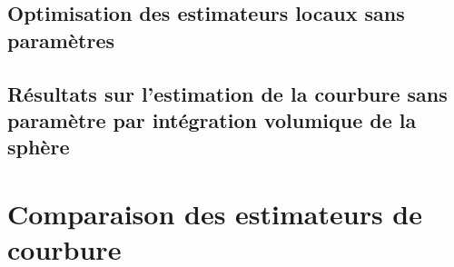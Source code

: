 \subsection{Optimisation des estimateurs locaux sans paramètres}
%
%
\subsection{Résultats sur l’estimation de la courbure sans paramètre par
intégration volumique de la sphère}
%
\todoInlineJeremy{-------------------------------}




\section{Comparaison des estimateurs de courbure}%
\label{sec:comparaison-courbure}
